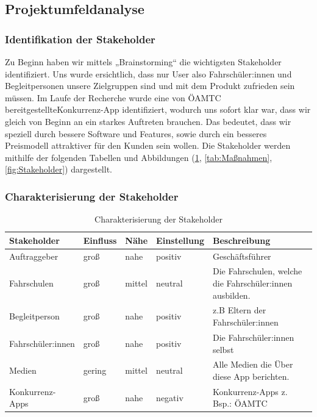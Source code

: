 \subsection{Projektumfeldanalyse}

\subsubsection*{Identifikation der Stakeholder}
Zu Beginn haben wir mittels „Brainstorming“ die wichtigsten Stakeholder identifiziert. Uns wurde ersichtlich, dass nur User also Fahrschüler:innen und Begleitpersonen unsere Zielgruppen sind und mit dem Produkt zufrieden sein müssen. Im Laufe der Recherche wurde eine von ÖAMTC bereitgestellte\hfill\break Konkurrenz-App identifiziert, wodurch uns sofort klar war, dass wir gleich von Beginn an ein starkes Auftreten brauchen. Das bedeutet, dass wir speziell durch bessere Software und Features, sowie durch ein besseres Preismodell attraktiver für den Kunden sein wollen. Die Stakeholder werden mithilfe der folgenden Tabellen und Abbildungen (\cref{tab:Charakterisierung}, \cref{tab:Maßnahmen}, \cref{fig:Stakeholder}) dargestellt.



\subsubsection*{Charakterisierung der Stakeholder}
\begin{table}[H]
	\centering
	\begin{tabularx}{\textwidth}{|l|l|l|l|X|}
		\hline
		\textbf{Stakeholder} & \textbf{Einfluss} & \textbf{Nähe} & \textbf{Einstellung} & \textbf{Beschreibung} \\
		\hline
		Auftraggeber & groß & nahe & positiv & Geschäftsführer \\
		\hline
		Fahrschulen & groß & mittel & neutral & Die Fahrschulen, welche die Fahrschüler:innen ausbilden. \\
		\hline
		Begleitperson & groß & nahe & positiv & z.B Eltern der Fahrschüler:innen \\
		\hline
		Fahrschüler:innen & groß & nahe & positiv & Die Fahrschüler:innen selbst \\
		\hline
		Medien & gering & mittel & neutral & Alle Medien die Über diese App berichten. \\
		\hline
		Konkurrenz-Apps & groß & nahe & negativ & Konkurrenz-Apps z. Bsp.: ÖAMTC \\
		\hline
	\end{tabularx}
	\caption{Charakterisierung der Stakeholder}
	\label{tab:Charakterisierung}

\end{table}

